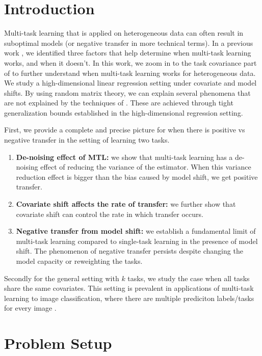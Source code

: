 \section{Introduction}

Multi-task learning that is applied on heterogeneous data can often result in suboptimal models (or negative transfer in more technical terms).
In a previous work \cite{WZR20}, we identified three factors that help determine when multi-task learning works, and when it doesn't.
In this work, we zoom in to the task covariance part of \cite{WZR20} to further understand when multi-task learning works for heterogeneous data.
We study a high-dimensional linear regression setting under covariate and model shifts.
By using random matrix theory, we can explain several phenomena that are not explained by the techniques of \cite{WZR20}.
These are achieved through tight generalization bounds established in the high-dimensional regression setting.

First, we provide a complete and precise picture for when there is positive vs negative transfer in the setting of learning two tasks.
\begin{enumerate}
	\item {\bf De-noising effect of MTL:} we show that multi-task learning has a de-noising effect of reducing the variance of the estimator.
	When this variance reduction effect is bigger than the bias caused by model shift, we get positive transfer.
	\item {\bf Covariate shift affects the rate of transfer:} we further show that covariate shift can control the rate in which transfer occurs.
	\item {\bf Negative transfer from model shift:} we establish a fundamental limit of multi-task learning compared to single-task learning in the presence of model shift.
	The phenomenon of negative transfer persists despite changing the model capacity or reweighting the tasks.
\end{enumerate}

Secondly for the general setting with $k$ tasks, we study the case when all tasks share the same covariates.
This setting is prevalent in applications of multi-task learning to image classification, where there are multiple prediciton labels/tasks for every image \cite{EA20}.


\section{Problem Setup}\label{sec_setup}


